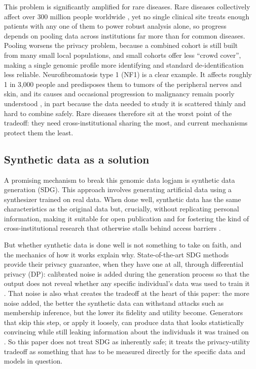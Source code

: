 \documentclass[webpdf,contemporary,large]{oup-authoring-template}
\begin{document}
This problem is significantly amplified for rare diseases. Rare diseases collectively affect over 300 million people worldwide \citep{lancetgh2024rarediseases}, yet no single clinical site treats enough patients with any one of them to power robust analysis alone, so progress depends on pooling data across institutions far more than for common diseases. Pooling worsens the privacy problem, because a combined cohort is still built from many small local populations, and small cohorts offer less ``crowd cover'', making a single genomic profile more identifying and standard de-identification less reliable. Neurofibromatosis type 1 (NF1) is a clear example. It affects roughly 1 in 3{,}000 people and predisposes them to tumors of the peripheral nerves and skin, and its causes and occasional progression to malignancy remain poorly understood \citep{rasmussen2000nf1}, in part because the data needed to study it is scattered thinly and hard to combine safely. Rare diseases therefore sit at the worst point of the tradeoff: they need cross-institutional sharing the most, and current mechanisms protect them the least.

\subsection{Synthetic data as a solution}

A promising mechanism to break this genomic data logjam is synthetic data generation (SDG). This approach involves generating artificial data using a synthesizer trained on real data. When done well, synthetic data has the same characteristics as the original data but, crucially, without replicating personal information, making it suitable for open publication and for fostering the kind of cross-institutional research that otherwise stalls behind access barriers \citep{hu2023sok,jordon2022synthetic}.

But whether synthetic data is done well is not something to take on faith, and the mechanics of how it works explain why. State-of-the-art SDG methods provide their privacy guarantee, when they have one at all, through differential privacy (DP): calibrated noise is added during the generation process so that the output does not reveal whether any specific individual's data was used to train it \citep{dwork2014algorithmic}. That noise is also what creates the tradeoff at the heart of this paper: the more noise added, the better the synthetic data can withstand attacks such as membership inference, but the lower its fidelity and utility become. Generators that skip this step, or apply it loosely, can produce data that looks statistically convincing while still leaking information about the individuals it was trained on \citep{stadler2022synthetic}. So this paper does not treat SDG as inherently safe; it treats the privacy-utility tradeoff as something that has to be measured directly for the specific data and models in question.
\end{document}
